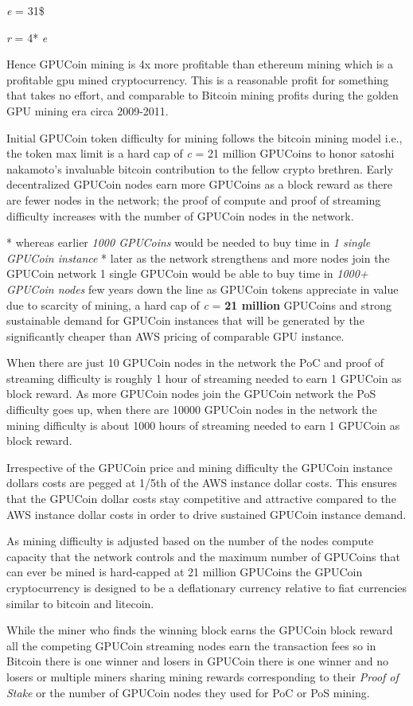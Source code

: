 \emph{e} = 31\$

\emph{r} = 4* \emph{e}  


Hence GPUCoin mining is 4x more profitable than ethereum mining which is a profitable gpu mined cryptocurrency. This is a reasonable profit for something that takes no effort, and comparable to Bitcoin mining profits during the golden GPU mining era circa 2009-2011.

Initial GPUCoin token difficulty for mining follows the bitcoin mining model i.e., the token max limit is a hard cap of \emph{c} = 21 million GPUCoins to honor satoshi nakamoto’s invaluable bitcoin contribution to the fellow crypto brethren. Early decentralized GPUCoin nodes earn more GPUCoins as a block reward as there are fewer nodes in the network; the proof of compute and proof of streaming difficulty increases with the number of GPUCoin nodes in the network.

* whereas earlier \emph{1000 GPUCoins} would be needed to buy time in \emph{1 single GPUCoin instance}
* later as the network strengthens and more nodes join the GPUCoin network 1 single GPUCoin would be able to buy time in \emph{1000+ GPUCoin nodes} few years down the line as GPUCoin tokens appreciate in value due to scarcity of mining, a hard cap of \emph{c} = \textbf{21 million} GPUCoins and strong sustainable demand for GPUCoin instances that will be generated by the significantly cheaper than AWS pricing of comparable GPU instance.

When there are just 10 GPUCoin nodes in the network the PoC and proof of streaming difficulty is roughly 1 hour of streaming needed to earn 1 GPUCoin as block reward. As more GPUCoin nodes join the GPUCoin network the PoS difficulty goes up, when there are 10000 GPUCoin nodes in the network the mining difficulty is about 1000 hours of streaming needed to earn 1 GPUCoin as block reward.

Irrespective of the GPUCoin price and mining difficulty the GPUCoin instance dollars costs are pegged at 1/5th of the AWS instance dollar costs. This ensures that the GPUCoin dollar costs stay competitive and attractive compared to the AWS instance dollar costs in order to drive sustained GPUCoin instance demand.

As mining difficulty is adjusted based on the number of the nodes compute capacity that the network controls and the maximum number of GPUCoins that can ever be mined is hard-capped at 21 million GPUCoins the GPUCoin cryptocurrency is designed to be a deflationary currency relative to fiat currencies similar to bitcoin and litecoin.

While the miner who finds the winning block earns the GPUCoin block reward all the competing GPUCoin streaming nodes earn the transaction fees so in Bitcoin there is one winner and losers in GPUCoin there is one winner and no losers or multiple miners sharing mining rewards corresponding to their \emph{Proof of Stake} or the number of GPUCoin nodes they used for PoC or PoS mining.
